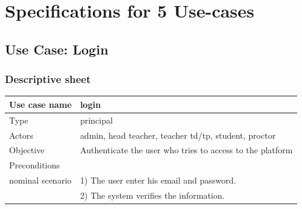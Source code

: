 \documentclass[]{uc2pfecaneva}
\begin{document}
    \thispagestyle{empty}
    \begin{table}[h]
        \raggedright\section{Specifications for 5 Use-cases}

        \raggedright\subsection{Use Case: Login}
        \subsubsection{Descriptive sheet}
        \centering
        \begin{tabularx}{\textwidth}{|l|X|}
            \hline
            Use case name         & login                                                                                                                                                                \\ \hline
            Type                  & principal                                                                                                                                                            \\ \hline
            Actors                & admin, head teacher, teacher td/tp, student, proctor                                                                                                                 \\ \hline
            Objective             & Authenticate the user who tries to access to the platform                                                                                                            \\ \hline
            Preconditions         &                                                                                                                                                                      \\ \hline
            nominal scenario
            & 1) The user enter his email and password.                                                                                                                            \\
            & 2) The system verifies the information.                                                                                                                              \\

\end{tabularx}
\end{table}
\end{document}
